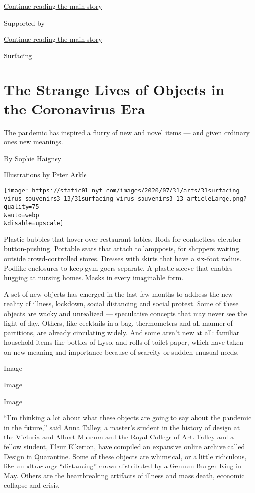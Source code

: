 \protect\hyperlink{after-top}{Continue reading the main story}

Supported by

\protect\hyperlink{after-sponsor}{Continue reading the main story}

Surfacing

\hypertarget{the-strange-lives-of-objects-in-the-coronavirus-era}{%
\section{The Strange Lives of Objects in the Coronavirus
Era}\label{the-strange-lives-of-objects-in-the-coronavirus-era}}

The pandemic has inspired a flurry of new and novel items --- and given
ordinary ones new meanings.

By Sophie Haigney

Illustrations by Peter Arkle

\texttt{[image: https://static01.nyt.com/images/2020/07/31/arts/31surfacing-virus-souvenirs3-13/31surfacing-virus-souvenirs3-13-articleLarge.png?quality=75\\\&auto=webp\\\&disable=upscale]}

Plastic bubbles that hover over restaurant tables. Rods for contactless
elevator-button-pushing. Portable seats that attach to lampposts, for
shoppers waiting outside crowd-controlled stores. Dresses with skirts
that have a six-foot radius. Podlike enclosures to keep gym-goers
separate. A plastic sleeve that enables hugging at nursing homes. Masks
in every imaginable form.

A set of new objects has emerged in the last few months to address the
new reality of illness, lockdown, social distancing and social protest.
Some of these objects are wacky and unrealized --- speculative concepts
that may never see the light of day. Others, like cocktails-in-a-bag,
thermometers and all manner of partitions, are already circulating
widely. And some aren't new at all: familiar household items like
bottles of Lysol and rolls of toilet paper, which have taken on new
meaning and importance because of scarcity or sudden unusual needs.

Image

Image

Image

``I'm thinking a lot about what these objects are going to say about the
pandemic in the future,'' said Anna Talley, a master's student in the
history of design at the Victoria and Albert Museum and the Royal
College of Art. Talley and a fellow student, Fleur Elkerton, have
compiled an expansive online archive called
\href{https://designinquarantine.com/}{Design in Quarantine}. Some of
these objects are whimsical, or a little ridiculous, like an ultra-large
``distancing'' crown distributed by a German Burger King in May. Others
are the heartbreaking artifacts of illness and mass death, economic
collapse and crisis.

